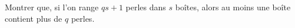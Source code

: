 Montrer que, si l'on range $qs + 1$ perles dans $s$ boîtes, alors au moins une boîte contient plus de $q$ perles.
